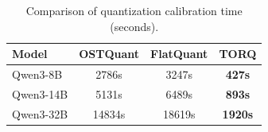 \begin{table}[h]
\centering
\caption{Comparison of quantization calibration time (seconds).}
\label{tab:time_cost}
\begin{tabular}{lccc}
\toprule
\textbf{Model} & \textbf{OSTQuant} & \textbf{FlatQuant} & \textbf{TORQ} \\
\midrule
Qwen3-8B & 2786s & 3247s & \textbf{427s} \\
Qwen3-14B & 5131s & 6489s & \textbf{893s} \\
Qwen3-32B & 14834s & 18619s & \textbf{1920s} \\
\bottomrule
\end{tabular}
\end{table}